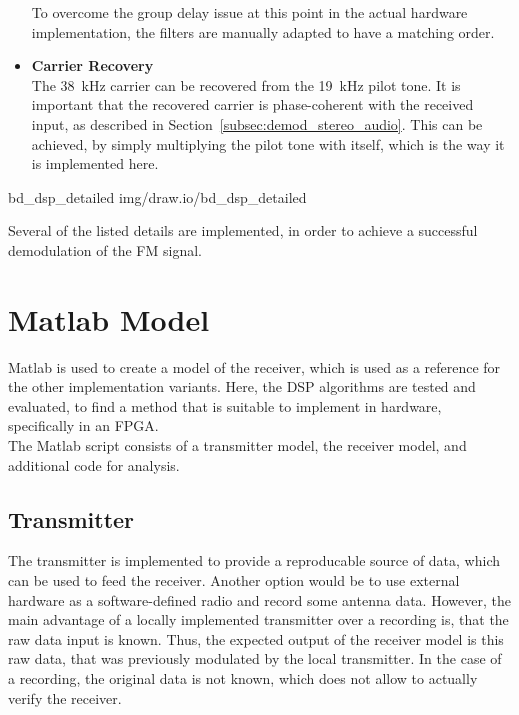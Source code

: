 \begin{itemize}
      To overcome the group delay issue at this point in the actual hardware implementation, the filters are manually adapted to have a matching order.\\
  \item \textbf{Carrier Recovery}\\
      The 38~kHz carrier can be recovered from the 19~kHz pilot tone.
      It is important that the recovered carrier is phase-coherent with the received input, as described in Section~\ref{subsec:demod_stereo_audio}.
      This can be achieved, by simply multiplying the pilot tone with itself, which is the way it is implemented here.\\
\end{itemize}

 {bd_dsp_detailed} {img/draw.io/bd_dsp_detailed}

\noindent
Several of the listed details are implemented, in order to achieve a successful demodulation of the FM signal.

\section{Matlab Model}

Matlab is used to create a model of the receiver, which is used as a reference for the other implementation variants.
Here, the DSP algorithms are tested and evaluated, to find a method that is suitable to implement in hardware, specifically in an FPGA.\\

The Matlab script consists of a transmitter model, the receiver model, and additional code for analysis.

\subsection{Transmitter}

The transmitter is implemented to provide a reproducable source of data, which can be used to feed the receiver.
Another option would be to use external hardware as a software-defined radio and record some antenna data.
However, the main advantage of a locally implemented transmitter over a recording is, that the raw data input is known.
Thus, the expected output of the receiver model is this raw data, that was previously modulated by the local transmitter.
In the case of a recording, the original data is not known, which does not allow to actually verify the receiver.\\

